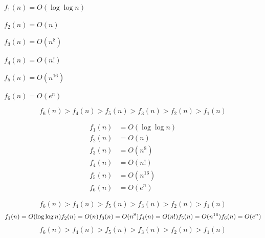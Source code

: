$f_1(n)=O(\log\log n)$

$f_2(n)=O(n)$

$f_3(n)=O(n^8)$

$f_4(n)=O(n!)$

$f_5(n)=O(n^{16})$

$f_6(n)=O(e^n)$

$$
f_6(n) > f_4(n) > f_5(n) > f_3(n) > f_2(n) > f_1(n)
$$

$$
\begin{aligned}
f_1(n) &= O(\log\log n) \\
f_2(n) &= O(n) \\
f_3(n) &= O(n^8) \\
f_4(n) &= O(n!) \\
f_5(n) &= O(n^{16}) \\
f_6(n) &= O(e^n)
\end{aligned}
$$

$$
f_6(n) > f_4(n) > f_5(n) > f_3(n) > f_2(n) > f_1(n)
$$
$$
f_1(n) = O(\log\log n) \\
f_2(n) = O(n) \\
f_3(n) = O(n^8) \\
f_4(n) = O(n!) \\
f_5(n) = O(n^{16}) \\
f_6(n) = O(e^n)
$$
$$
f_6(n) > f_4(n) > f_5(n) > f_3(n) > f_2(n) > f_1(n)
$$